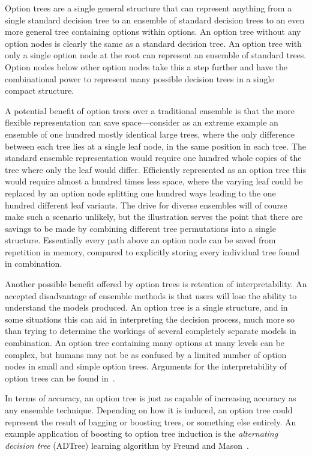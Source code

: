 Option trees are a single general structure that can represent anything from a single standard decision tree to an ensemble of standard decision trees to an even more general tree containing options within options. An option tree without any option nodes is clearly the same as a standard decision tree. An option tree with only a single option node at the root can represent an ensemble of standard trees. Option nodes below other option nodes take this a step further and have the combinational power to represent many possible decision trees in a single compact structure.

A potential benefit of option trees over a traditional ensemble is that the more flexible representation can save space---consider as an extreme example an ensemble of one hundred mostly identical large trees, where the only difference between each tree lies at a single leaf node, in the same position in each tree. The standard ensemble representation would require one hundred whole copies of the tree where only the leaf would differ. Efficiently represented as an option tree this would require almost a hundred times less space, where the varying leaf could be replaced by an option node splitting one hundred ways leading to the one hundred different leaf variants. The drive for diverse ensembles will of course make such a scenario unlikely, but the illustration serves the point that there are savings to be made by combining different tree permutations into a single structure. Essentially every path above an option node can be saved from repetition in memory, compared to explicitly storing every individual tree found in combination.

Another possible benefit offered by option trees is retention of interpretability. An accepted disadvantage of ensemble methods is that users will lose the ability to understand the models produced. An option tree is a single structure, and in some situations this can aid in interpreting the decision process, much more so than trying to determine the workings of several completely separate models in combination. An option tree containing many options at many levels can be complex, but humans may not be as confused by a limited number of option nodes in small and simple option trees. Arguments for the interpretability of option trees can be found in~\cite{kohaviot,adtrees}.

In terms of accuracy, an option tree is just as capable of increasing accuracy as any ensemble technique. Depending on how it is induced, an option tree could represent the result of bagging or boosting trees, or something else entirely. An example application of boosting to option tree induction is the {\em alternating decision tree} (ADTree) learning algorithm by Freund and Mason~\cite{adtrees}.

